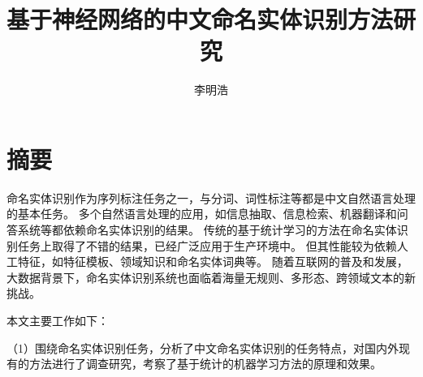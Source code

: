 \confidential{}%
\title{基于神经网络的中文命名实体识别方法研究}%
\author{李明浩}%
\advisorsec{}%
\maketitle
\makeenglishtitle
\makedeclaration
\chapter{摘\quad 要}
\setcounter{page}{1}%

命名实体识别作为序列标注任务之一，与分词、词性标注等都是中文自然语言处理的基本任务。
多个自然语言处理的应用，如信息抽取、信息检索、机器翻译和问答系统等都依赖命名实体识别的结果。
传统的基于统计学习的方法在命名实体识别任务上取得了不错的结果，已经广泛应用于生产环境中。
但其性能较为依赖人工特征，如特征模板、领域知识和命名实体词典等。
随着互联网的普及和发展，大数据背景下，命名实体识别系统也面临着海量无规则、多形态、跨领域文本的新挑战。

本文主要工作如下：

（1）围绕命名实体识别任务，分析了中文命名实体识别的任务特点，对国内外现有的方法进行了调查研究，考察了基于统计的机器学习方法的原理和效果。

